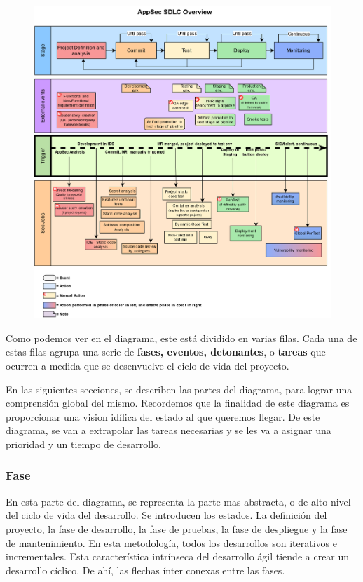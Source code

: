 \documentclass[12pt]{report} %
\begin{document}
\begin{figure}[H] 
  \includegraphics[width=\textwidth]{SDLC-Sec}
  \label{fig:SDLCOverview}
\end{figure}

Como podemos ver en el diagrama, este está dividido en varias filas.  Cada una
de estas filas agrupa una serie de \textbf{fases, eventos, detonantes}, o
\textbf{tareas} que ocurren a medida que se desenvuelve el ciclo de vida del
proyecto.

En las siguientes secciones, se describen las partes del diagrama, para
lograr una comprensión global del mismo.  Recordemos que la finalidad de este
diagrama es proporcionar una vision idílica del estado al que queremos llegar.
De este diagrama, se van a extrapolar las tareas necesarias y se les va a
asignar una prioridad y un tiempo de desarrollo. 

\subsubsection{Fase} 

En esta parte del diagrama, se representa la parte mas abstracta, o de alto
nivel del ciclo de vida del desarrollo.  Se introducen los estados.  La
definición del proyecto, la fase de desarrollo, la fase de pruebas, la fase de
despliegue y la fase de mantenimiento.  En esta metodología, todos los
desarrollos son iterativos e incrementales.  Esta característica intrínseca del
desarrollo ágil tiende a crear un desarrollo cíclico.  De ahí, las flechas ínter
conexas entre las fases.
\end{document}
